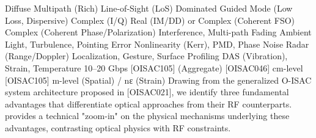 {}\markdownRendererPipe{}  \markdownRendererPipe{} Diffuse Multipath (Rich) \markdownRendererPipe{} Line-of-Sight (LoS) Dominated \markdownRendererPipe{} Guided Mode (Low Loss, Dispersive) \markdownRendererPipe{}\markdownRendererSoftLineBreak
{}\markdownRendererPipe{}  \markdownRendererPipe{} Complex (I/Q) \markdownRendererPipe{} Real (IM/DD) or Complex (Coherent FSO) \markdownRendererPipe{} Complex (Coherent Phase/Polarization) \markdownRendererPipe{}\markdownRendererSoftLineBreak
{}\markdownRendererPipe{}  \markdownRendererPipe{} Interference, Multi-path Fading \markdownRendererPipe{} Ambient Light, Turbulence, Pointing Error \markdownRendererPipe{} Nonlinearity (Kerr), PMD, Phase Noise \markdownRendererPipe{}\markdownRendererSoftLineBreak
{}\markdownRendererPipe{}  \markdownRendererPipe{} Radar (Range/Doppler) \markdownRendererPipe{} Localization, Gesture, Surface Profiling \markdownRendererPipe{} DAS (Vibration), Strain, Temperature \markdownRendererPipe{}\markdownRendererSoftLineBreak
{}\markdownRendererPipe{}  \markdownRendererPipe{} \markdownRendererTilde{}10–20 Gbps \markdownRendererPipe{}  [O\markdownRendererUnderscore{}ISAC\markdownRendererUnderscore{}105] \markdownRendererPipe{}  (Aggregate) [O\markdownRendererUnderscore{}ISAC\markdownRendererUnderscore{}046] \markdownRendererPipe{}\markdownRendererSoftLineBreak
{}\markdownRendererPipe{}  \markdownRendererPipe{} cm-level \markdownRendererPipe{}  [O\markdownRendererUnderscore{}ISAC\markdownRendererUnderscore{}105] \markdownRendererPipe{} m-level (Spatial) / nε (Strain) \markdownRendererPipe{}\markdownRendererInterblockSeparator
{}
\markdownRendererSectionEnd \markdownRendererSectionBegin
{}\markdownRendererInterblockSeparator
{}Drawing from the generalized O-ISAC system architecture proposed in [O\markdownRendererUnderscore{}ISAC\markdownRendererUnderscore{}021], we identify three fundamental advantages that differentiate optical approaches from their RF counterparts.  provides a technical "zoom-in" on the physical mechanisms underlying these advantages, contrasting optical physics with RF constraints.\markdownRendererParagraphSeparator
